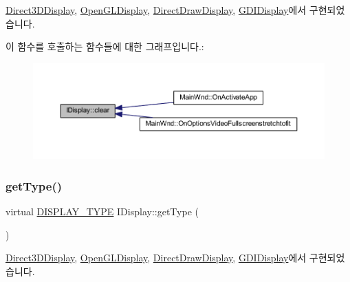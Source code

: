 \mbox{\hyperlink{class_direct3_d_display_a67b8e31e5bb726cb82efbfb0be90935f}{Direct3\+D\+Display}}, \mbox{\hyperlink{class_open_g_l_display_abef343fb8d951b4bc63bd3b7afe285a2}{Open\+G\+L\+Display}}, \mbox{\hyperlink{class_direct_draw_display_a90c0576a1ad6b80c1377df94d4eaa1a2}{Direct\+Draw\+Display}}, \mbox{\hyperlink{class_g_d_i_display_a68a4add7ba35706237739a587131f463}{G\+D\+I\+Display}}에서 구현되었습니다.

이 함수를 호출하는 함수들에 대한 그래프입니다.\+:
\nopagebreak
\begin{figure}[H]
\begin{center}
\leavevmode
\includegraphics[width=350pt]{class_i_display_affb8a8b5651d138058cdbd088ff3968d_icgraph}
\end{center}
\end{figure}
\mbox{\label{class_i_display_a2c7fd4c6721dd8a6992b78f0c588f6f9}} 
\subsubsection{\texorpdfstring{get\+Type()}{getType()}}
{\footnotesize\ttfamily virtual \mbox{\hyperlink{_display_8h_aa50f63b0688d0250e0be64d8401d09a0}{D\+I\+S\+P\+L\+A\+Y\+\_\+\+T\+Y\+PE}} I\+Display\+::get\+Type (\begin{DoxyParamCaption}{ }\end{DoxyParamCaption})\hspace{0.3cm}{\ttfamily [pure virtual]}}



\mbox{\hyperlink{class_direct3_d_display_a517a805d2a5ebb732671851162920868}{Direct3\+D\+Display}}, \mbox{\hyperlink{class_open_g_l_display_a82bec99b2136823801a0cf90813de9c2}{Open\+G\+L\+Display}}, \mbox{\hyperlink{class_direct_draw_display_ab680561928153be1285c826d3e4f0dd7}{Direct\+Draw\+Display}}, \mbox{\hyperlink{class_g_d_i_display_a4c7acf65b39361a2a1479c71f6f404a7}{G\+D\+I\+Display}}에서 구현되었습니다.


